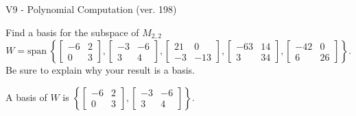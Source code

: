 \begin{exercise}
  \begin{exerciseTitle}V9 - Polynomial Computation (ver. 198)\end{exerciseTitle}
  \begin{exerciseStatement}
    Find a basis for the subspace of \(M_{2,2}\) 
\[W=\mathrm{span}\ \left\{\left[\begin{array}{cc}
-6 & 2 \\
0 & 3
\end{array}\right] , \left[\begin{array}{cc}
-3 & -6 \\
3 & 4
\end{array}\right] , \left[\begin{array}{cc}
21 & 0 \\
-3 & -13
\end{array}\right] , \left[\begin{array}{cc}
-63 & 14 \\
3 & 34
\end{array}\right] , \left[\begin{array}{cc}
-42 & 0 \\
6 & 26
\end{array}\right]\right\}.\]
 Be sure to explain why your result is a basis.


  \end{exerciseStatement}
  \begin{exerciseAnswer}
   A basis of \(W\) is  \(\left\{\left[\begin{array}{cc}
-6 & 2 \\
0 & 3
\end{array}\right] , \left[\begin{array}{cc}
-3 & -6 \\
3 & 4
\end{array}\right]\right\}\).
  


  \end{exerciseAnswer}
\end{exercise}